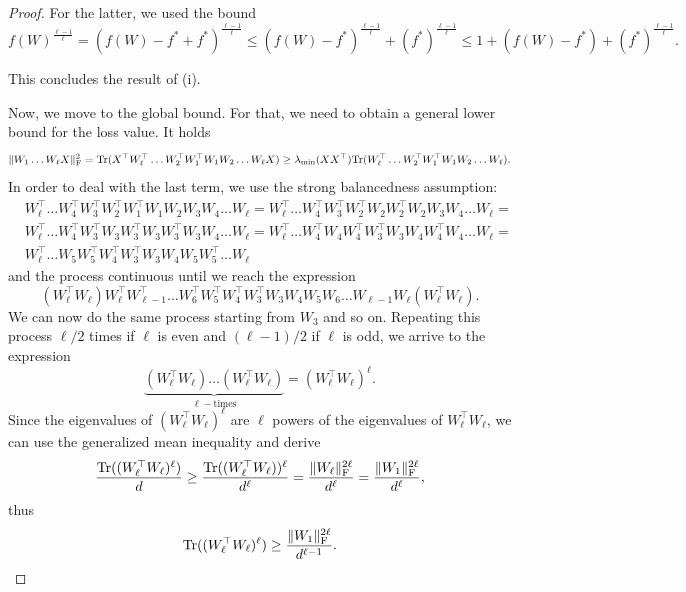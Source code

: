 \documentclass[a4paper,11pt]{article}
\newcommand{\1}{\mathbbm{1}}
\theoremstyle{plain}
\begin{document}
\begin{proof}
For the latter, we used the bound
$$ f(W)^{\frac{\ell-1}{\ell}} = (f(W)-f^* +f^*)^{\frac{\ell-1}{\ell}} \leq (f(W)-f^*)^{\frac{\ell-1}{\ell}} + (f^*)^{\frac{\ell-1}{\ell}} \leq 1 + (f(W)-f^*) + (f^*)^{\frac{\ell-1}{\ell}}.$$

This concludes the result of (i).

Now, we move to the global bound. For that, we need to obtain a general lower bound for the loss value. It holds
\begin{align}
\label{eq:eq1}
    \|W_1 \dots W_{\ell} X\|^2_{\rm F} = \text{Tr}(X^\top W_{\ell}^\top \dots W_2^\top W_1^\top W_1 W_2 \dots W_{\ell} X)  \geq \lambda_{\min}(X X^\top) \text{Tr}( W_{\ell}^\top \dots W_2^\top W_1^\top W_1 W_2 \dots W_{\ell}).
\end{align}
In order to deal with the last term, we use the strong balancedness assumption:
\begin{align*}
   & W_{\ell}^\top \dots W_4^\top W_3^\top W_2^\top W_1^\top W_1 W_2 W_3 W_4 \dots W_{\ell}  = W_{\ell}^\top \dots W_4^\top W_3^\top W_2^\top W_2 W_2^\top W_2 W_3 W_4 \dots W_{\ell} = \\ & W_{\ell}^\top \dots W_4^\top W_3^\top W_3 W_3^\top W_3 W_3^\top W_3 W_4 \dots W_{\ell} = W_{\ell}^\top \dots W_4^\top W_4 W_4^\top W_3^\top W_3 W_4 W_4^\top W_4 \dots W_{\ell} = \\ & W_{\ell}^\top \dots W_5 W_5^\top W_4^\top W_3^\top W_3 W_4 W_5 W_5^\top \dots W_{\ell}
\end{align*}
and the process continuous until we reach the expression $$(W_{\ell}^\top W_{\ell}) W_{\ell}^\top W_{\ell-1}^\top \dots W_6^\top W_5^\top W_4^\top W_3^\top W_3 W_4 W_5 W_6 \dots W_{\ell-1} W_{\ell} (W_{\ell}^\top W_{\ell}).$$ We can now do the same process starting from $W_3$ and so on. Repeating this process $\ell/2$ times if $\ell$ is even and $(\ell-1)/2$ if $\ell$ is odd, we arrive to the expression
\begin{equation*}
   \underbrace{(W_{\ell}^\top W_{\ell}) \dots (W_{\ell}^\top W_{\ell})}_{\ell- \text{times}} = (W_{\ell}^\top W_{\ell})^{\ell}. 
\end{equation*}
Since the eigenvalues of $(W_{\ell}^\top W_{\ell})^\ell$ are $\ell$ powers of the eigenvalues of $W_{\ell}^\top W_{\ell}$, we can use the generalized mean inequality and derive
\begin{equation*}
   \frac{\text{Tr}((W_{\ell}^\top W_{\ell})^\ell)}{d} \geq \frac{\text{Tr}((W_{\ell}^\top W_{\ell}))^\ell}{d^{\ell}} = \frac{\|W_{\ell}\|_{\rm F}^{2 \ell}}{d^{\ell}} = \frac{\|W_1\|_{\rm F}^{2 \ell}}{d^{\ell}},  
\end{equation*}
thus 
\begin{equation}
\label{eq:eq2}
    \text{Tr}((W_{\ell}^\top W_{\ell})^\ell ) \geq \frac{\|W_1\|_{\rm F}^{2 \ell}}{d^{\ell-1}}.
\end{equation}


\end{proof}
\end{document}

